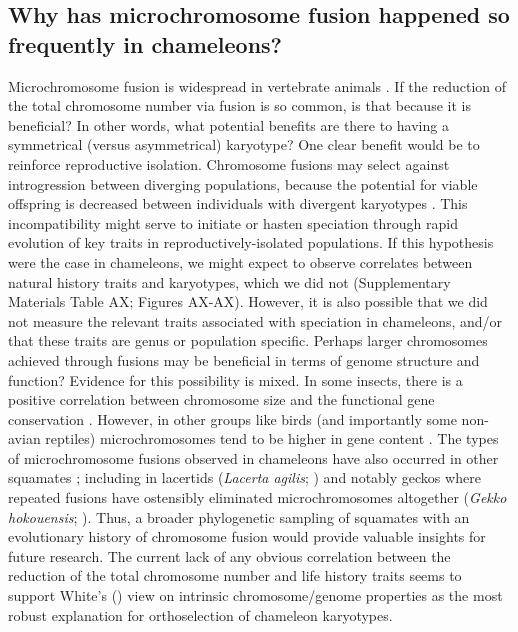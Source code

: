 \documentclass[a4paper, 12pt]{article}
\begin{document}
\subsection{Why has microchromosome fusion happened so frequently in chameleons?}
Microchromosome fusion is widespread in vertebrate animals \citep{waters2021microchromosomes}. 
If the reduction of the total chromosome number via fusion is so common, is that because it is beneficial? In other words, what potential benefits are there to having a symmetrical (versus asymmetrical) karyotype? 
One clear benefit would be to reinforce reproductive isolation. 
Chromosome fusions may select against introgression between diverging populations, because the potential for viable offspring is decreased between individuals with divergent karyotypes \citep{cicconardi2021chromosome}.
This incompatibility might serve to initiate or hasten speciation through rapid evolution of key traits in reproductively-isolated populations. If this hypothesis were the case in chameleons, we might expect to observe correlates between natural history traits and karyotypes, which we did not (Supplementary Materials Table AX; Figures AX-AX). 
However, it is also possible that we did not measure the relevant traits associated with speciation in chameleons, and/or that these traits are genus or population specific.
Perhaps larger chromosomes achieved through fusions may be beneficial in terms of genome structure and function? Evidence for this possibility is mixed. In some insects, there is a positive correlation between chromosome size and the functional gene conservation \citep{cicconardi2021chromosome}. 
However, in other groups like birds (and importantly some non-avian reptiles) microchromosomes tend to be higher in gene content \citep{waters2021microchromosomes}.
The types of microchromosome fusions observed in chameleons have also occurred in other squamates \citep{deakin2016anchoring}; including in lacertids (\textit{Lacerta agilis}; \citealt{srikulnath2014identification}) and notably geckos where repeated fusions have ostensibly eliminated microchromosomes altogether (\textit{Gekko hokouensis}; \citealt{srikulnath2015karyotype}). 
Thus, a broader phylogenetic sampling of squamates with an evolutionary history of chromosome fusion would provide valuable insights for future research. 
The current lack of any obvious correlation between the reduction of the total chromosome number and life history traits seems to support White's (\citeyear{white1973,white1975chromosome}) view on intrinsic chromosome/genome properties as the most robust explanation for orthoselection of chameleon karyotypes.
\end{document}
